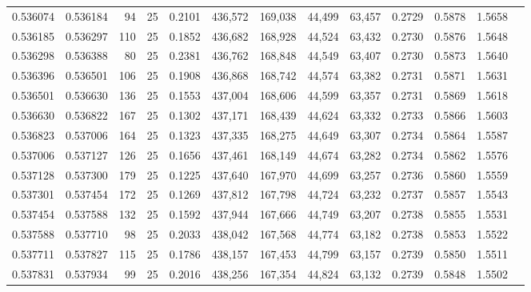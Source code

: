 \begin{tabular}{rrrrrrrrrrrrr}
0.536074 & 0.536184 &    94 &  25 &                                     0.2101 & 436,572 & 169,038 &  44,499 &  63,457 & 0.2729 & 0.5878 & 1.5658 \\
0.536185 & 0.536297 &   110 &  25 &                                     0.1852 & 436,682 & 168,928 &  44,524 &  63,432 & 0.2730 & 0.5876 & 1.5648 \\
0.536298 & 0.536388 &    80 &  25 &                                     0.2381 & 436,762 & 168,848 &  44,549 &  63,407 & 0.2730 & 0.5873 & 1.5640 \\
0.536396 & 0.536501 &   106 &  25 &                                     0.1908 & 436,868 & 168,742 &  44,574 &  63,382 & 0.2731 & 0.5871 & 1.5631 \\
0.536501 & 0.536630 &   136 &  25 &                                     0.1553 & 437,004 & 168,606 &  44,599 &  63,357 & 0.2731 & 0.5869 & 1.5618 \\
0.536630 & 0.536822 &   167 &  25 &                                     0.1302 & 437,171 & 168,439 &  44,624 &  63,332 & 0.2733 & 0.5866 & 1.5603 \\
0.536823 & 0.537006 &   164 &  25 &                                     0.1323 & 437,335 & 168,275 &  44,649 &  63,307 & 0.2734 & 0.5864 & 1.5587 \\
0.537006 & 0.537127 &   126 &  25 &                                     0.1656 & 437,461 & 168,149 &  44,674 &  63,282 & 0.2734 & 0.5862 & 1.5576 \\
0.537128 & 0.537300 &   179 &  25 &                                     0.1225 & 437,640 & 167,970 &  44,699 &  63,257 & 0.2736 & 0.5860 & 1.5559 \\
0.537301 & 0.537454 &   172 &  25 &                                     0.1269 & 437,812 & 167,798 &  44,724 &  63,232 & 0.2737 & 0.5857 & 1.5543 \\
0.537454 & 0.537588 &   132 &  25 &                                     0.1592 & 437,944 & 167,666 &  44,749 &  63,207 & 0.2738 & 0.5855 & 1.5531 \\
0.537588 & 0.537710 &    98 &  25 &                                     0.2033 & 438,042 & 167,568 &  44,774 &  63,182 & 0.2738 & 0.5853 & 1.5522 \\
0.537711 & 0.537827 &   115 &  25 &                                     0.1786 & 438,157 & 167,453 &  44,799 &  63,157 & 0.2739 & 0.5850 & 1.5511 \\
0.537831 & 0.537934 &    99 &  25 &                                     0.2016 & 438,256 & 167,354 &  44,824 &  63,132 & 0.2739 & 0.5848 & 1.5502 \\

\end{tabular}
